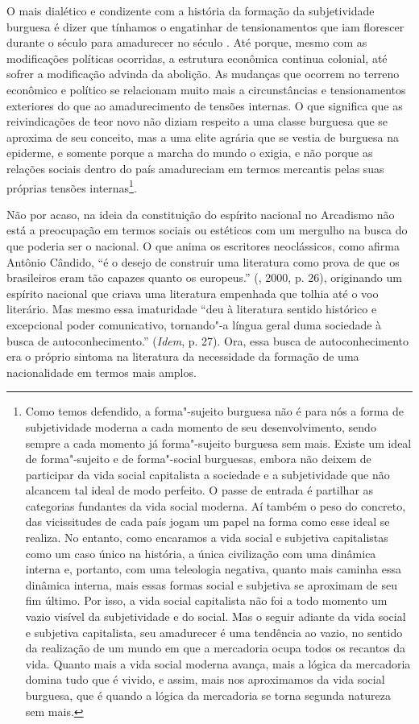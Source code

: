 {O mais dialético e condizente com a história da formação da
subjetividade burguesa é dizer que tínhamos o engatinhar de
tensionamentos que iam florescer durante o século  para amadurecer no
século . Até porque, mesmo com as modificações políticas ocorridas, a
estrutura econômica continua colonial, até sofrer a modificação advinda
da abolição. As mudanças que ocorrem no terreno econômico e político se
relacionam muito mais a circunstâncias e tensionamentos exteriores do
que ao amadurecimento de tensões internas. O que significa que as
reivindicações de teor novo não diziam respeito a uma classe burguesa
que se aproxima de seu conceito, mas a uma elite agrária que se vestia
de burguesa na epiderme, e somente porque a marcha do mundo o exigia, e
não porque as relações sociais dentro do país amadureciam em termos
mercantis pelas suas próprias tensões internas\footnote{Como temos
  defendido, a forma"-sujeito burguesa não é para nós a forma de
  subjetividade moderna a cada momento de seu desenvolvimento, sendo
  sempre a cada momento já forma"-sujeito burguesa sem mais. Existe um
  ideal de forma"-sujeito e de forma"-social burguesas, embora não deixem
  de participar da vida social capitalista a sociedade e a subjetividade
  que não alcancem tal ideal de modo perfeito. O passe de entrada é
  partilhar as categorias fundantes da vida social moderna. Aí também o
  peso do concreto, das vicissitudes de cada país jogam um papel na
  forma como esse ideal se realiza. No entanto, como encaramos a vida
  social e subjetiva capitalistas como um caso único na história, a
  única civilização com uma dinâmica interna e, portanto, com
  uma teleologia negativa, quanto mais caminha essa dinâmica interna,
  mais essas formas social e subjetiva se aproximam de seu fim último.
  Por isso, a vida social capitalista não foi a todo momento um vazio
  visível da subjetividade e do social. Mas o seguir adiante da vida
  social e subjetiva capitalista, seu amadurecer é uma tendência ao
  vazio, no sentido da realização de um mundo em que a mercadoria ocupa
  todos os recantos da vida. Quanto mais a vida social moderna avança,
  mais a lógica da mercadoria domina tudo que é vivido, e assim, mais
  nos aproximamos da vida social burguesa, que é quando a lógica da
  mercadoria se torna segunda natureza sem mais.}.

Não por acaso, na ideia da constituição do espírito nacional no
Arcadismo não está a preocupação em termos sociais ou estéticos com um
mergulho na busca do que poderia ser o nacional. O que anima os
escritores neoclássicos, como afirma Antônio Cândido, ``é o desejo de
construir uma literatura como prova de que os brasileiros eram tão
capazes quanto os europeus.'' (, 2000, p. 26), originando um
espírito nacional que criava uma literatura empenhada que tolhia até o
voo literário. Mas mesmo essa imaturidade ``deu à literatura sentido
histórico e excepcional poder comunicativo, tornando"-a língua geral duma
sociedade à busca de autoconhecimento.'' (\emph{Idem}, p. 27). Ora, essa
busca de autoconhecimento era o próprio sintoma na literatura da
necessidade da formação de uma nacionalidade em termos mais amplos.

}
